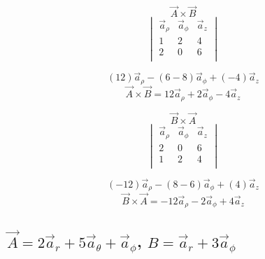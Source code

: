 \documentclass[14pt]{extarticle}
\begin{document}
\begin{multicols}{2}
	\begin{center}
		$$\vec{A}\times\vec{B}$$
		\[
			\begin{vmatrix}
				\vec{a}_\rho & \vec{a}_\phi & \vec{a}_z \\
				1            & 2            & 4         \\
				2            & 0            & 6         \\
			\end{vmatrix}
		\]

		$$(12)\vec{a}_\rho-(6-8)\vec{a}_\phi+(-4)\vec{a}_z$$
		$$\vec{A}\times\vec{B}=12\vec{a}_\rho+2\vec{a}_\phi-4\vec{a}_z$$
	\end{center}
	\begin{center}
		$$\vec{B}\times\vec{A}$$
		\[
			\begin{vmatrix}
				\vec{a}_\rho & \vec{a}_\phi & \vec{a}_z \\
				2            & 0            & 6         \\
				1            & 2            & 4         \\
			\end{vmatrix}
		\]

		$$(-12)\vec{a}_\rho-(8-6)\vec{a}_\phi+(4)\vec{a}_z$$
		$$\vec{B}\times\vec{A}=-12\vec{a}_\rho-2\vec{a}_\phi+4\vec{a}_z$$
	\end{center}
\end{multicols}

\clearpage

\boldmath
\subsection{$\vec{A}=2\vec{a}_r+5\vec{a}_\theta+\vec{a}_\phi$, $B=\vec{a}_r+3\vec{a}_\phi$}
\unboldmath
\end{document}
